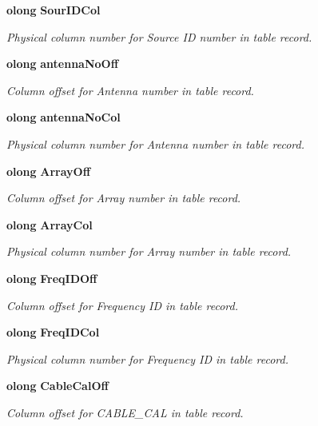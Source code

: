 \begin{CompactItemize}
{\bf olong} {\bf Sour\-IDCol}
\begin{CompactList}\small\item\em Physical column number for Source ID number in table record. \item\end{CompactList}\item 
{\bf olong} {\bf antenna\-No\-Off}
\begin{CompactList}\small\item\em Column offset for Antenna number in table record. \item\end{CompactList}\item 
{\bf olong} {\bf antenna\-No\-Col}
\begin{CompactList}\small\item\em Physical column number for Antenna number in table record. \item\end{CompactList}\item 
{\bf olong} {\bf Array\-Off}
\begin{CompactList}\small\item\em Column offset for Array number in table record. \item\end{CompactList}\item 
{\bf olong} {\bf Array\-Col}
\begin{CompactList}\small\item\em Physical column number for Array number in table record. \item\end{CompactList}\item 
{\bf olong} {\bf Freq\-IDOff}
\begin{CompactList}\small\item\em Column offset for Frequency ID in table record. \item\end{CompactList}\item 
{\bf olong} {\bf Freq\-IDCol}
\begin{CompactList}\small\item\em Physical column number for Frequency ID in table record. \item\end{CompactList}\item 
{\bf olong} {\bf Cable\-Cal\-Off}
\begin{CompactList}\small\item\em Column offset for CABLE\_\-CAL in table record. \item\end{CompactList}\item 

\end{CompactItemize}
